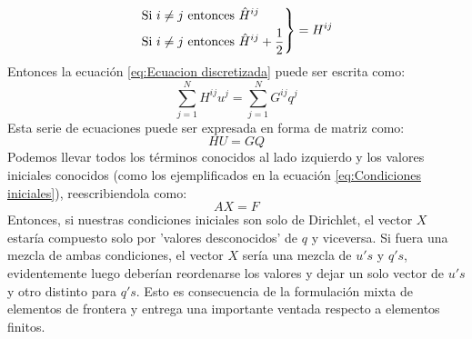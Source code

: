 \documentclass[11pt]{article}
\begin{document}
\begin{equation*}
\label{eq:Desarrollo de H}
\left.
\begin{aligned}
\textnormal{Si }i\not = j&\textnormal{ entonces } \hat{H}^{ij}\\
\textnormal{Si }i\not = j&\textnormal{ entonces } \hat{H}^{ij}+\frac{1}{2}
\end{aligned}
\right\}
=H^{ij}
\end{equation*}
Entonces la ecuación \eqref{eq:Ecuacion discretizada} puede ser escrita como:
\begin{equation}
\label{eq:Sumatoria de H y G}
\sum_{j=1}^NH^{ij}u^j=\sum_{j=1}^N G^{ij}q^j
\end{equation}
Esta serie de ecuaciones puede ser expresada en forma de matriz como:
\begin{equation}
\label{eq:Forma matricial HU=GQ}
HU=GQ
\end{equation}
Podemos llevar todos los términos conocidos al lado izquierdo y los valores iniciales conocidos (como los ejemplificados en la ecuación \eqref{eq:Condiciones iniciales}), reescribiendola como:
\begin{equation}
\label{eq:Forma matricial AX=F}
AX=F
\end{equation}
Entonces, si nuestras condiciones iniciales son solo de Dirichlet, el vector $X$ estaría compuesto solo por 'valores desconocidos' de $q$ y viceversa. Si fuera una mezcla de ambas condiciones, el vector $X$ sería una mezcla de $u's$ y $q's$, evidentemente luego deberían reordenarse los valores y dejar un solo vector de $u's$ y otro distinto para $q's$. Esto es consecuencia de la formulación mixta de elementos de frontera y entrega una importante ventada respecto a elementos finitos.
\end{document}
